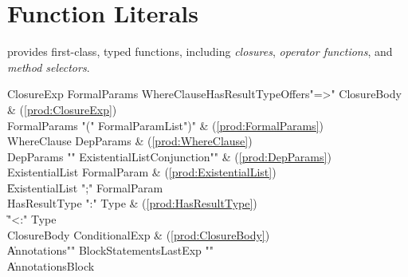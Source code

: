 %


\section{Function Literals}
\label{FunctionLiteral}

\Xten{} provides first-class, typed functions, including
\emph{closures}, \emph{operator functions}, and \emph{method
  selectors}.

\begin{bbgrammar}
          ClosureExp \: FormalParams WhereClause\opt HasResultType\opt Offers\opt \xcd"=>" ClosureBody & (\ref{prod:ClosureExp}) \\
        FormalParams \: \xcd"(" FormalParamList\opt \xcd")" & (\ref{prod:FormalParams}) \\
         WhereClause \: DepParams & (\ref{prod:WhereClause}) \\
           DepParams \: \xcd"{" ExistentialList\opt Conjunction\opt \xcd"}" & (\ref{prod:DepParams}) \\
     ExistentialList \: FormalParam & (\ref{prod:ExistentialList}) \\
                    \| ExistentialList \xcd";" FormalParam \\
       HasResultType \: \xcd":" Type & (\ref{prod:HasResultType}) \\
                    \| \xcd"<:" Type \\
         ClosureBody \: ConditionalExp & (\ref{prod:ClosureBody}) \\
                    \| Annotations\opt \xcd"{" BlockStatements\opt LastExp \xcd"}" \\
                    \| Annotations\opt Block \\
\end{bbgrammar}

